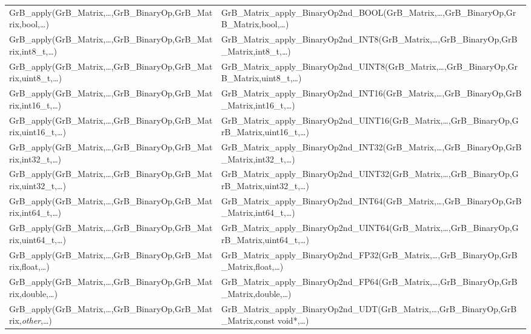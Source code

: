 \begin{landscape}
\begin{table}[htb]
{\begin{tabular}{l|l}
{\sf GrB\_apply(GrB\_Matrix,\ldots,GrB\_BinaryOp,GrB\_Matrix,bool,\ldots)}		& {\sf GrB\_Matrix\_apply\_BinaryOp2nd\_BOOL(GrB\_Matrix,\ldots,GrB\_BinaryOp,GrB\_Matrix,bool,\ldots)} \\
{\sf GrB\_apply(GrB\_Matrix,\ldots,GrB\_BinaryOp,GrB\_Matrix,int8\_t,\ldots)}	& {\sf GrB\_Matrix\_apply\_BinaryOp2nd\_INT8(GrB\_Matrix,\ldots,GrB\_BinaryOp,GrB\_Matrix,int8\_t,\ldots)} \\
{\sf GrB\_apply(GrB\_Matrix,\ldots,GrB\_BinaryOp,GrB\_Matrix,uint8\_t,\ldots)}	& {\sf GrB\_Matrix\_apply\_BinaryOp2nd\_UINT8(GrB\_Matrix,\ldots,GrB\_BinaryOp,GrB\_Matrix,uint8\_t,\ldots)} \\
{\sf GrB\_apply(GrB\_Matrix,\ldots,GrB\_BinaryOp,GrB\_Matrix,int16\_t,\ldots)}	& {\sf GrB\_Matrix\_apply\_BinaryOp2nd\_INT16(GrB\_Matrix,\ldots,GrB\_BinaryOp,GrB\_Matrix,int16\_t,\ldots)} \\
{\sf GrB\_apply(GrB\_Matrix,\ldots,GrB\_BinaryOp,GrB\_Matrix,uint16\_t,\ldots)}	& {\sf GrB\_Matrix\_apply\_BinaryOp2nd\_UINT16(GrB\_Matrix,\ldots,GrB\_BinaryOp,GrB\_Matrix,uint16\_t,\ldots)} \\
{\sf GrB\_apply(GrB\_Matrix,\ldots,GrB\_BinaryOp,GrB\_Matrix,int32\_t,\ldots)}	& {\sf GrB\_Matrix\_apply\_BinaryOp2nd\_INT32(GrB\_Matrix,\ldots,GrB\_BinaryOp,GrB\_Matrix,int32\_t,\ldots)} \\
{\sf GrB\_apply(GrB\_Matrix,\ldots,GrB\_BinaryOp,GrB\_Matrix,uint32\_t,\ldots)}	& {\sf GrB\_Matrix\_apply\_BinaryOp2nd\_UINT32(GrB\_Matrix,\ldots,GrB\_BinaryOp,GrB\_Matrix,uint32\_t,\ldots)} \\
{\sf GrB\_apply(GrB\_Matrix,\ldots,GrB\_BinaryOp,GrB\_Matrix,int64\_t,\ldots)}	& {\sf GrB\_Matrix\_apply\_BinaryOp2nd\_INT64(GrB\_Matrix,\ldots,GrB\_BinaryOp,GrB\_Matrix,int64\_t,\ldots)} \\
{\sf GrB\_apply(GrB\_Matrix,\ldots,GrB\_BinaryOp,GrB\_Matrix,uint64\_t,\ldots)}	& {\sf GrB\_Matrix\_apply\_BinaryOp2nd\_UINT64(GrB\_Matrix,\ldots,GrB\_BinaryOp,GrB\_Matrix,uint64\_t,\ldots)} \\
{\sf GrB\_apply(GrB\_Matrix,\ldots,GrB\_BinaryOp,GrB\_Matrix,float,\ldots)}		& {\sf GrB\_Matrix\_apply\_BinaryOp2nd\_FP32(GrB\_Matrix,\ldots,GrB\_BinaryOp,GrB\_Matrix,float,\ldots)} \\
{\sf GrB\_apply(GrB\_Matrix,\ldots,GrB\_BinaryOp,GrB\_Matrix,double,\ldots)}	& {\sf GrB\_Matrix\_apply\_BinaryOp2nd\_FP64(GrB\_Matrix,\ldots,GrB\_BinaryOp,GrB\_Matrix,double,\ldots)} \\
{\sf GrB\_apply(GrB\_Matrix,\ldots,GrB\_BinaryOp,GrB\_Matrix,\emph{other},\ldots)}		& {\sf GrB\_Matrix\_apply\_BinaryOp2nd\_UDT(GrB\_Matrix,\ldots,GrB\_BinaryOp,GrB\_Matrix,const void*,\ldots)} \\
\hline
\end{tabular}
}
\label{Tab:NonPolymorphic5b}
\end{table}
\end{landscape}

